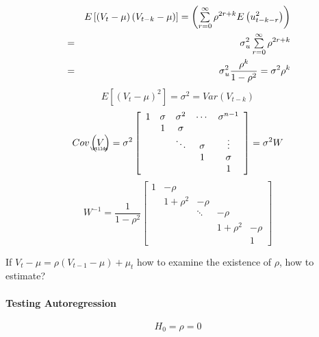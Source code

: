 \documentclass{article}
\begin{document}
\begin{eqnarray*}
&\therefore &E\left[ \left( V_{t}-\mu \right) \left( V_{t-k}-\mu \right) %
\right] =\left( \tsum\limits_{r=0}^{\infty }\rho ^{2r+k}E\left(
u_{t-k-r}^{2}\right) \right) \\
&=&\sigma _{u}^{2}\tsum\limits_{r=0}^{\infty }\rho ^{2r+k} \\
&=&\sigma _{u}^{2}\frac{\rho ^{k}}{1-\rho ^{2}}=\sigma ^{2}\rho ^{k}
\end{eqnarray*}%
\begin{equation*}
E\left[ \left( V_{t}-\mu \right) ^{2}\right] =\sigma ^{2}=Var\left(
V_{t-k}\right)
\end{equation*}%
\begin{equation*}
Cov\left( 
\underaccent{\wtilde}{V}%
\right) =\sigma ^{2}\left[ 
\begin{array}{ccccc}
1 & \sigma & \sigma ^{2} & \cdots & \sigma ^{n-1} \\ 
& 1 & \sigma &  &  \\ 
&  & \ddots & \sigma & \vdots \\ 
&  &  & 1 & \sigma \\ 
&  &  &  & 1%
\end{array}%
\right] =\sigma ^{2}W
\end{equation*}%
\begin{equation*}
W^{-1}=\frac{1}{1-\rho ^{2}}\left[ 
\begin{array}{ccccc}
1 & -\rho &  &  &  \\ 
& 1+\rho ^{2} & -\rho &  &  \\ 
&  & \ddots & -\rho &  \\ 
&  &  & 1+\rho ^{2} & -\rho \\ 
&  &  &  & 1%
\end{array}%
\right]
\end{equation*}

If $V_{t}-\mu =\rho \left( V_{t-1}-\mu \right) +\mu _{t}$ how to examine the
existence of $\rho $, how to estimate?

\bigskip

\paragraph{Testing Autoregression}

\begin{equation*}
H_{0}=\rho =0
\end{equation*}
\end{document}
